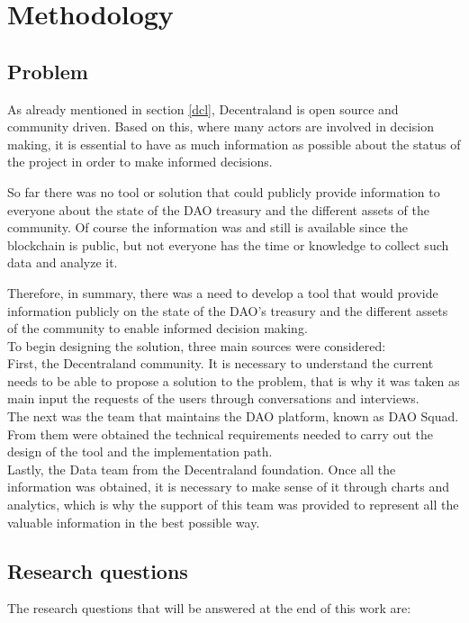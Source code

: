 \documentclass[MSE,Master,english]{twbook}%
\begin{document}
\chapter{Methodology\label{method}}
\section{Problem}
As already mentioned in section \ref{dcl}, Decentraland is open source and community driven. Based on this, where many actors are involved in decision making, it is essential to have as much information as possible about the status of the project in order to make informed decisions.

So far there was no tool or solution that could publicly provide information to everyone about the state of the DAO treasury and the different assets of the community. Of course the information was and still is available since the blockchain is public, but not everyone has the time or knowledge to collect such data and analyze it.

Therefore, in summary, there was a need to develop a tool that would provide information publicly on the state of the DAO's treasury and the different assets of the community to enable informed decision making. \\

To begin designing the solution, three main sources were considered: \\

First, the Decentraland community. It is necessary to understand the current needs to be able to propose a solution to the problem, that is why it was taken as main input the requests of the users through conversations and interviews. \\

The next was the team that maintains the DAO platform, known as DAO Squad. From them were obtained the technical requirements needed to carry out the design of the tool and the implementation path. \\

Lastly, the Data team from the Decentraland foundation. Once all the information was obtained, it is necessary to make sense of it through charts and analytics, which is why the support of this team was provided to represent all the valuable information in the best possible way.

\section{Research questions}
The research questions that will be answered at the end of this work are: \\
\end{document}
